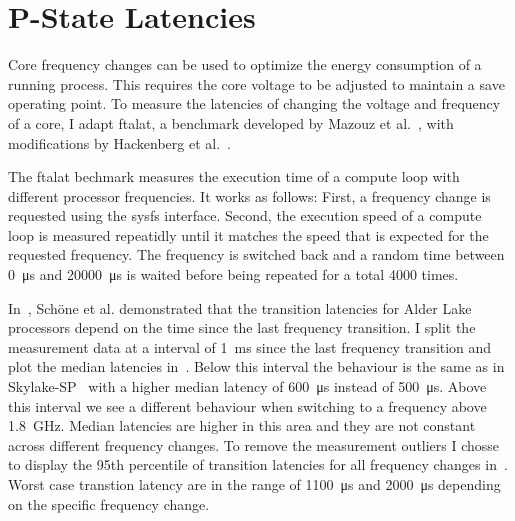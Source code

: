 

\section{P-State Latencies}
\label{sec:pstate_latencies}

Core frequency changes can be used to optimize the energy consumption of a running process.
This requires the core voltage to be adjusted to maintain a save operating point.
To measure the latencies of changing the voltage and frequency of a core, I adapt ftalat, a benchmark developed by Mazouz et al.~\cite{Mazouz_2014_ftalat}, with modifications by Hackenberg et al.~\cite{Hackenberg_2015_Haswell}.

The ftalat bechmark measures the execution time of a compute loop with different processor frequencies.
It works as follows:
First, a frequency change is requested using the sysfs interface.
Second, the execution speed of a compute loop is measured repeatidly until it matches the speed that is expected for the requested frequency.
The frequency is switched back and a random time between \SI{0}{\us} and \SI{20000}{\us} is waited before being repeated for a total \SI{4000}{} times.

In~\cite{Schoene_2024_Alder_Lake}, Schöne et al. demonstrated that the transition latencies for Alder Lake processors depend on the time since the last frequency transition.
I split the measurement data at a interval of \SI{1}{\ms} since the last frequency transition and plot the median latencies in~.
Below this interval the behaviour is the same as in Skylake-SP~\cite{Schoene_2019_SKL} with a higher median latency of \SI{600}{\us} instead of \SI{500}{\us}.
Above this interval we see a different behaviour when switching to a frequency above \SI{1.8}{\GHz}.
Median latencies are higher in this area and they are not constant across different frequency changes.
To remove the measurement outliers I chosse to display the 95th percentile of transition latencies for all frequency changes in~.
Worst case transtion latency are in the range of \SI{1100}{\us} and \SI{2000}{\us} depending on the specific frequency change.

